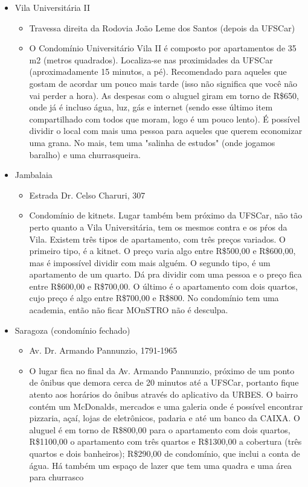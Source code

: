 \begin{itemize}
  \item Vila Universitária II
    \begin{itemize}
      \item Travessa direita da Rodovia João Leme dos Santos (depois da UFSCar)
      \item O Condomínio Universitário Vila II é composto por apartamentos de 35 m2 (metros quadrados). Localiza-se nas proximidades da UFSCar (aproximadamente 15 minutos, a pé). Recomendado para aqueles que gostam de acordar um pouco mais tarde (isso não significa que você não vai perder a hora). As despesas com o aluguel giram em torno de R\$650, onde já é incluso água, luz, gás e internet (sendo esse último item compartilhado com todos que moram, logo é um pouco lento). É possível dividir o local com mais uma pessoa para aqueles que querem economizar uma grana. No mais, tem uma "salinha de estudos" (onde jogamos baralho) e uma churrasqueira.
    \end{itemize}
  \item Jambalaia
    \begin{itemize}
      \item Estrada Dr. Celso Charuri, 307
      \item Condomínio de kitnets. Lugar também bem próximo da UFSCar, não tão perto quanto a Vila Universitária, tem os mesmos contra e os pŕos da Vila. Existem três tipos de apartamento, com três preços variados. O primeiro tipo, é a kitnet. O preço varia algo entre R\$500,00 e R\$600,00, mas é impossível dividir com mais alguém. O segundo tipo, é um apartamento de um quarto. Dá pra dividir com uma pessoa e o preço fica entre R\$600,00 e R\$700,00. O último é o apartamento com dois quartos, cujo preço é algo entre R\$700,00 e R\$800. No condomínio tem uma academia, então não ficar MOnSTRO não é desculpa.
    \end{itemize}
  \item Saragoza (condomínio fechado)
    \begin{itemize}
      \item Av. Dr. Armando Pannunzio, 1791-1965
      \item{O lugar fica no final da Av. Armando Pannunzio, próximo de um ponto de ônibus que demora cerca de 20 minutos até a UFSCar, portanto fique atento aos horários do ônibus através do aplicativo da URBES. O bairro contém um McDonalds, mercados e uma galeria onde é possível encontrar pizzaria, açaí, lojas de eletrônicos, padaria e até um banco da CAIXA. 
	      O aluguel é em torno de R\$800,00 para o apartamento com dois quartos, R\$1100,00 o apartamento com três quartos e R\$1300,00 a cobertura (três quartos e dois banheiros); R\$290,00 de condomínio, que inclui a conta de água. Há também um espaço de lazer que tem uma quadra e uma área para churrasco}
    \end{itemize}


\end{itemize}
